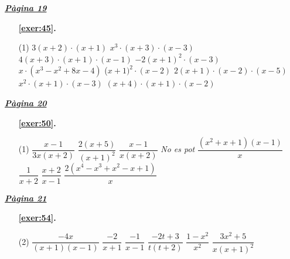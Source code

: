 
\hyperlink{page.19}{\textbf{\em Pàgina 19}}
\begin{enumerate}



 \item[\fontfamily{phv}\selectfont\color{blue}\textbf{\ref{exer:45}. }] \label{ans:45}
 \begin{tasks}[column-sep=1em, item-indent=1.3333em](1)
	 \task  $3(x+2)\cdot (x+1)$
	 \task $x^{3}\cdot (x+3)\cdot (x-3)$
	 \task $4(x+3)\cdot (x+1)\cdot (x-1)$
	 \task $-2(x+1)^{2}\cdot (x-3)$
	 \task $x\cdot (x^{3}-x^{2}+8x-4)$
	 \task ($x+1)^{2}\cdot (x-2)$
	 \task $2(x+1)\cdot (x-2)\cdot (x-5)$
	 \task $x^{2}\cdot (x+1)\cdot (x-3)$
	 \task $(x+4)\cdot (x+1)\cdot (x-2)$ 
\end{tasks}
 \end{enumerate}
\vspace{0.3cm}


\hyperlink{page.20}{\textbf{\em Pàgina 20}}
\begin{enumerate}



 \item[\fontfamily{phv}\selectfont\color{blue}\textbf{\ref{exer:50}. }] \label{ans:50}
 \begin{tasks}[column-sep=1em, item-indent=1.3333em](1)
	 \task  $\dfrac {x-1}{3x(x+2)} $
	 \task $\dfrac {2(x+5)}{(x+1)^{2} } $
	 \task $\dfrac {x-1}{x(x+2)} $
	 \task \textit {No es pot}
	 \task* $\dfrac {(x^{2} +x+1)(x-1)}{x^{} } $
	 \task $\dfrac {1}{x+2} $
	 \task $\dfrac {x+2}{x-1} $
	 \task* $\dfrac {2(x^{4} -x^{3} +x^{2} -x+1)}{x} $
\end{tasks}
 \end{enumerate}
\vspace{0.3cm}


\hyperlink{page.21}{\textbf{\em Pàgina 21}}
\begin{enumerate}



 \item[\fontfamily{phv}\selectfont\color{blue}\textbf{\ref{exer:54}. }] \label{ans:54}
 \begin{tasks}[column-sep=1em, item-indent=1.3333em](2)
	 \task  $\dfrac {-4x}{(x+1)(x-1)} $
	 \task $\dfrac {-2}{x+1} $
	 \task $\dfrac {-1}{x-1} $
	 \task $\dfrac {-2t+3}{t(t+2)} $
	 \task $\dfrac {1-x^{2} }{x^{2} } $
	 \task $\dfrac {3x^{2} +5}{x(x+1)^{2} } $
\end{tasks}
 \end{enumerate}
\vspace{0.3cm}

